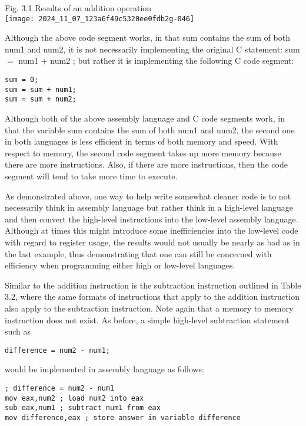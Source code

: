 \documentclass[10pt]{article}
\begin{document}
Fig. 3.1 Results of an addition operation\\
\texttt{[image: 2024\_11\_07\_123a6f49c5320ee0fdb2g-046]}

Although the above code segment works, in that sum contains the sum of both num1 and num2, it is not necessarily implementing the original C statement: sum $=$ num1 + num2 ; but rather it is implementing the following C code segment:

\begin{verbatim}
sum = 0;
sum = sum + num1;
sum = sum + num2;
\end{verbatim}

Although both of the above assembly language and C code segments work, in that the variable sum contains the sum of both num1 and num2, the second one in both languages is less efficient in terms of both memory and speed. With respect to memory, the second code segment takes up more memory because there are more instructions. Also, if there are more instructions, then the code segment will tend to take more time to execute.

As demonstrated above, one way to help write somewhat cleaner code is to not necessarily think in assembly language but rather think in a high-level language and then convert the high-level instructions into the low-level assembly language. Although at times this might introduce some inefficiencies into the low-level code with regard to register usage, the results would not usually be nearly as bad as in the last example, thus demonstrating that one can still be concerned with efficiency when programming either high or low-level languages.

Similar to the addition instruction is the subtraction instruction outlined in Table 3.2, where the same formats of instructions that apply to the addition instruction also apply to the subtraction instruction. Note again that a memory to memory instruction does not exist. As before, a simple high-level subtraction statement such as

\begin{verbatim}
difference = num2 - num1;
\end{verbatim}

would be implemented in assembly language as follows:

\begin{verbatim}
; difference = num2 - num1
mov eax,num2 ; load num2 into eax
sub eax,num1 ; subtract num1 from eax
mov difference,eax ; store answer in variable difference
\end{verbatim}
\end{document}
